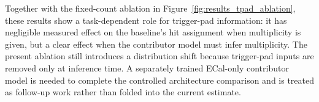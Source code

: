 Together with the fixed-count ablation in
Figure~\ref{fig:results_tpad_ablation}, these results show a task-dependent
role for trigger-pad information: it has negligible measured effect on the
baseline's hit assignment when multiplicity is given, but a clear effect when
the contributor model must infer multiplicity. The present ablation still
introduces a distribution shift because trigger-pad inputs are removed only at
inference time. A separately trained ECal-only contributor model is needed to
complete the controlled architecture comparison and is treated as follow-up
work rather than folded into the current estimate.


